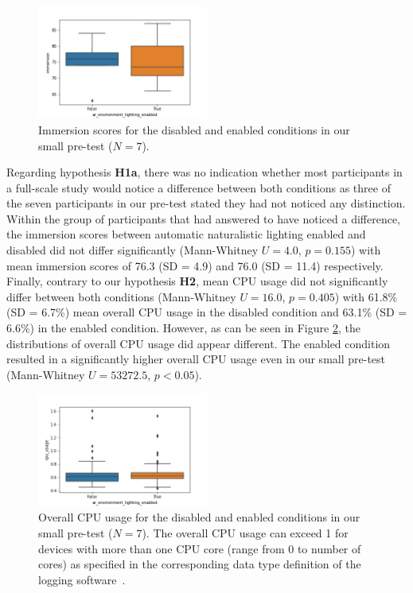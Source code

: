 \documentclass[12pt,twoside,english]{article}
\begin{document}
\begin{figure}[h]
    \centering
    \includegraphics[width=0.5\textwidth]{imgs/immersion_plot}
    \caption{Immersion scores for the disabled and enabled conditions in our small pre-test ($ N = 7 $).}
    \label{fig:immersion_plot}
\end{figure}

Regarding hypothesis \textbf{H1a}, there was no indication whether most participants in a full-scale study would notice a difference between both conditions as three of the seven participants in our pre-test stated they had not noticed any distinction.
Within the group of participants that had answered to have noticed a difference, the immersion scores between automatic naturalistic lighting enabled and disabled did not differ significantly (Mann-Whitney $ U = 4.0 $, $ p = 0.155 $) with mean immersion scores of 76.3 (SD = 4.9) and 76.0 (SD = 11.4) respectively.
Finally, contrary to our hypothesis \textbf{H2}, mean \gls{CPU} usage did not significantly differ between both conditions (Mann-Whitney $ U = 16.0 $, $ p = 0.405 $) with 61.8\% (SD = 6.7\%) mean overall \gls{CPU} usage in the disabled condition and 63.1\% (SD = 6.6\%) in the enabled condition.
However, as can be seen in Figure \ref{fig:cpu_raw_plot}, the distributions of overall \gls{CPU} usage did appear different.
The enabled condition resulted in a significantly higher overall \gls{CPU} usage even in our small pre-test (Mann-Whitney $ U = 53272.5 $, $ p < 0.05 $).

\begin{figure}[h]
    \centering
    \includegraphics[width=0.5\textwidth]{imgs/cpu_raw_plot}
    \caption{Overall \gls{CPU} usage for the disabled and enabled conditions in our small pre-test ($ N = 7 $). The overall \gls{CPU} usage can exceed 1 for devices with more than one \gls{CPU} core (range from 0 to number of cores) as specified in the corresponding data type definition of the logging software~\cite{apple_system_2020}.}
    \label{fig:cpu_raw_plot}
\end{figure}
\end{document}
